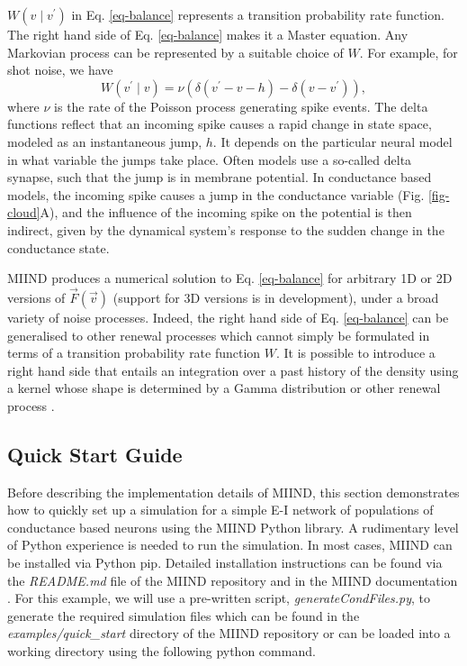 \documentclass[utf8]{frontiersSCNS} %
\begin{document}
$W(v \mid v^{\prime})$ in Eq. \ref{eq-balance} represents a transition probability rate function. The right hand side of Eq. \ref{eq-balance} makes it a Master equation. Any Markovian process can be represented by a suitable choice of $W$. For example, for shot noise, we have
\begin{equation}   
\label{master_equation}
  W(v^{\prime} \mid v) = \nu (\delta (v^{\prime} - v - h)  - \delta( v - v^{\prime})),  
\end{equation}
where $\nu$ is the rate of the Poisson process generating spike events. The delta functions reflect that an incoming spike causes a rapid change in state space, modeled as an instantaneous jump, $h$. It depends on the particular neural model in what variable the jumps take place. Often models use a so-called delta synapse, such that the jump is in membrane potential. In conductance based models, the incoming spike causes a jump in the conductance variable (Fig. \ref{fig-cloud}A), and the influence of the incoming spike on the potential is then indirect, given by the dynamical system's response to the sudden change in the conductance state.

MIIND produces a numerical solution to Eq. \ref{eq-balance} for arbitrary 1D or 2D versions of $\vec{F}(\vec{v})$ (support for 3D versions is in development), under a broad variety of noise processes. Indeed, the right hand side of Eq. \ref{eq-balance} can be generalised to other renewal processes which cannot simply be formulated in terms of a transition probability rate function $W$. It is possible to introduce a right hand side that entails an integration over a past history of the density using a kernel whose shape is determined by a Gamma distribution or other renewal process \citep{lai2017population}.

\subsection{Quick Start Guide}
\label{section:quickstart}
Before describing the implementation details of MIIND, this section demonstrates how to quickly set up a simulation for a simple E-I network of populations of conductance based neurons using the MIIND Python library. A rudimentary level of Python experience is needed to run the simulation. In most cases, MIIND can be installed via Python pip. Detailed installation instructions can be found via the \textit{README.md} file of the MIIND repository and in the MIIND documentation \citep{miindreadthedocs}. For this example, we will use a pre-written script, \textit{generateCondFiles.py}, to generate the required simulation files which can be found in the \textit{examples/quick\_start} directory of the MIIND repository or can be loaded into a working directory using the following python command.
\end{document}
